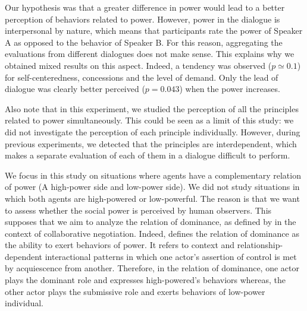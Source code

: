 \documentclass{llncs}
\begin{document}
			Our hypothesis was that a greater difference in power would lead to a better perception of behaviors related to power. However, power in the dialogue is interpersonal by nature, which means that participants rate the power of Speaker A as opposed to the behavior of Speaker B. For this reason, aggregating the evaluations from different dialogues does not make sense. This explains why we obtained mixed results on this aspect. Indeed, a tendency was observed ($p\simeq 0.1$) for self-centeredness, concessions and the level of demand. Only the lead of dialogue was clearly better perceived ($p=0. 043$) when the power increases.
			
			\medskip
			Also note that in this experiment, we studied the perception of all the principles related to power simultaneously. This could be seen as a limit of this study: we did not investigate the perception of each principle individually. However, during previous experiments, we detected that the principles are interdependent, which makes a separate evaluation of each of them in a dialogue difficult to perform.
			
			\medskip
			We focus in this study on situations where agents have a complementary relation of power (A high-power side and low-power side). We did not study situations in which both agents are high-powered or low-powerful. The reason is that we want to assess whether the social power is perceived by human observers. This supposes that we aim to analyze the relation of dominance, as defined by \cite{burgoonnonverbal} in the context of collaborative negotiation. Indeed, \cite{burgoonnonverbal} defines the relation of dominance as the ability to exert behaviors of power. It refers to context and relationship-dependent interactional  patterns in which one actor’s assertion of control is met by acquiescence from another. Therefore, in the relation of dominance, one actor plays the dominant role and expresses high-powered's behaviors whereas, the other actor plays the submissive role and exerts behaviors of low-power individual.
\end{document}
